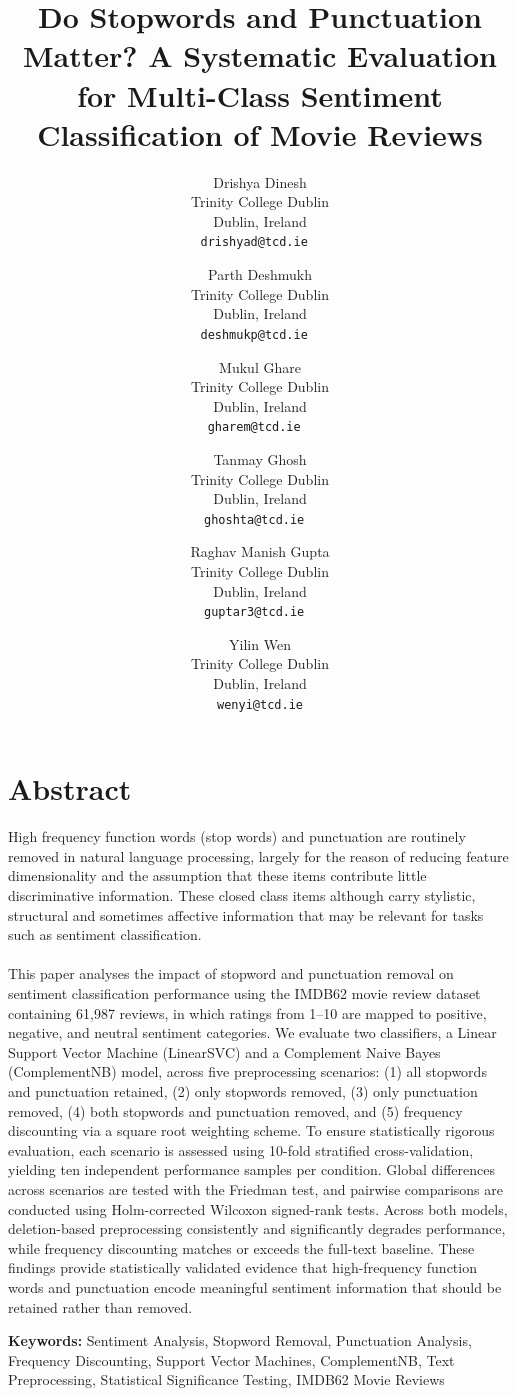 \documentclass[a4paper,10pt]{article}
\title{Do Stopwords and Punctuation Matter? A Systematic Evaluation for Multi-Class Sentiment Classification of Movie Reviews}
\date{}
\author{Drishya Dinesh\\
       Trinity College Dublin\\
       Dublin, Ireland\\
       \texttt{drishyad@tcd.ie}
       \
  \and Parth Deshmukh\\
       Trinity College Dublin\\
       Dublin, Ireland\\
       \texttt{deshmukp@tcd.ie}
       \
  \and Mukul Ghare\\
       Trinity College Dublin\\
       Dublin, Ireland\\
       \texttt{gharem@tcd.ie}
       \
  \and Tanmay Ghosh\\
       Trinity College Dublin\\
       Dublin, Ireland\\
       \texttt{ghoshta@tcd.ie}
       \
  \and Raghav Manish Gupta\\
       Trinity College Dublin\\
       Dublin, Ireland\\
       \texttt{guptar3@tcd.ie}
       \
  \and Yilin Wen\\
       Trinity College Dublin\\
       Dublin, Ireland\\
       \texttt{wenyi@tcd.ie}
}
\begin{document}
\maketitle
\thispagestyle{empty}
\pagestyle{empty}

\section{Abstract}
High frequency function words (stop words) and punctuation are routinely removed in natural language processing, largely for the reason of reducing feature dimensionality and the assumption that these items contribute little discriminative information. These closed class items although carry stylistic, structural and sometimes affective information that may be relevant for tasks such as sentiment classification.\\ \\
This paper analyses the impact of stopword and punctuation removal on
sentiment classification performance using the IMDB62 movie review dataset
containing 61,987 reviews, in which ratings from 1--10 are mapped to
positive, negative, and neutral sentiment categories. We evaluate two
classifiers, a Linear Support Vector Machine (LinearSVC) and a Complement
Naive Bayes (ComplementNB) model, across five preprocessing scenarios:
(1) all stopwords and punctuation retained, (2) only stopwords removed,
(3) only punctuation removed, (4) both stopwords and punctuation removed, and (5) frequency discounting via a square root weighting scheme. To ensure
statistically rigorous evaluation, each scenario is assessed using 10-fold stratified cross-validation, yielding ten independent performance samples per condition. Global differences across scenarios are tested with the Friedman test, and pairwise comparisons are conducted using Holm-corrected Wilcoxon signed-rank tests. Across both models, deletion-based preprocessing
consistently and significantly degrades performance, while frequency
discounting matches or exceeds the full-text baseline. These findings provide statistically validated evidence that high-frequency function words and punctuation encode meaningful sentiment information that should be retained rather than removed.

\medskip
\noindent\textbf{Keywords:} Sentiment Analysis, Stopword Removal, Punctuation Analysis, Frequency
Discounting, Support Vector Machines, ComplementNB, Text Preprocessing, Statistical Significance Testing, IMDB62 Movie Reviews
\end{document}
